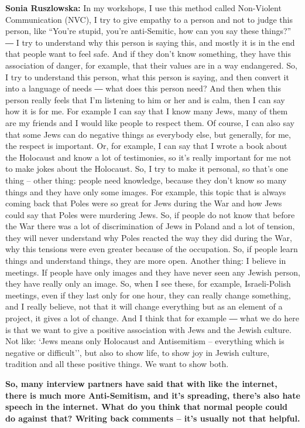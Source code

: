 \textbf{Sonia Ruszlowska:} In my workshops, I use this method called Non-Violent Communication (NVC), I try to give empathy to a person and not to judge this person, like ``You’re stupid, you’re anti-Semitic, how can you say these things?'' ― I try to understand why this person is saying this, and mostly it is in the end that people want to feel safe. And if they don’t know something, they have this association of danger, for example, that their values are in a way endangered. So, I try to understand this person, what this person is saying, and then convert it into a language of needs ― what does this person need? And then when this person really feels that I’m listening to him or her and is calm, then I can say how it is for me. For example I can say that I know many Jews, many of them are my friends and I would like people to respect them. Of course, I can also say that some Jews can do negative things as everybody else, but generally, for me, the respect is important. Or, for example, I can say that I wrote a book about the Holocaust and know a lot of testimonies, so it’s really important for me not to make jokes about the Holocaust. So, I try to make it personal, so that’s one thing – other thing: people need knowledge, because they don’t know so many things and they have only some images. For example, this topic that is always coming back that Poles were so great for Jews during the War and how Jews could say that Poles were murdering Jews. So, if people do not know that before the War there was a lot of discrimination of Jews in Poland and a lot of tension, they will never understand why Poles reacted the way they did during the War, why this tensions were even greater because of the occupation. So, if people learn things and understand things, they are more open.  
Another thing: I believe in meetings. If people have only images and they have never seen any Jewish person, they have really only an image. So, when I see these, for example, Israeli-Polish meetings, even if they last only for one hour, they can really change something, and I really believe, not that it will change everything but as an element of a project, it gives a lot of change. And I think that for example ― what we do here is that we want to give a positive association with Jews and the Jewish culture. Not like: `Jews means only Holocaust and Antisemitism – everything which is negative or difficult'', but also to show life, to show joy in Jewish culture, tradition and all these positive things. We want to show both. 

\textbf{So, many interview partners have said that with like the internet, there is much more Anti-Semitism, and it’s spreading, there’s also hate speech in the internet. What do you think that normal people could do against that? Writing back comments – it’s usually not that helpful.} 

